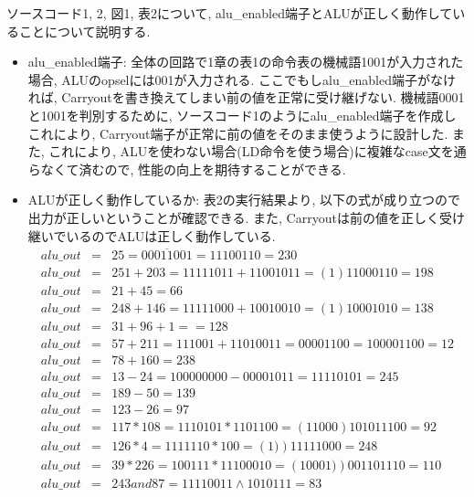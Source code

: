 \documentclass[12pt]{jreport}
\begin{document}
        ソースコード1, 2, 図1, 表2について, alu\_enabled端子とALUが正しく動作していることについて説明する. 
        \begin{itemize}
            \item alu\_enabled端子: 全体の回路で1章の表1の命令表の機械語1001が入力された場合, ALUのopselには001が入力される. ここでもしalu\_enabled端子がなければ, Carryoutを書き換えてしまい前の値を正常に受け継げない. 機械語0001と1001を判別するために, ソースコード1のようにalu\_enabled端子を作成しこれにより, Carryout端子が正常に前の値をそのまま使うように設計した. また, これにより, ALUを使わない場合(LD命令を使う場合)に複雑なcase文を通らなくて済むので, 性能の向上を期待することができる.  \newpage

            \item ALUが正しく動作しているか: 表2の実行結果より, 以下の式が成り立つので出力が正しいということが確認できる. また, Carryoutは前の値を正しく受け継いでいるのでALUは正しく動作している. 
            \begin{eqnarray*}
                alu\_out &=& 25 = \overline{00011001} = 11100110 = 230\\
                alu\_out &=& 251 + 203 = 11111011 + 11001011 = \left(1\right)11000110 = 198\\
                alu\_out &=& 21 + 45 = 66\\    
                alu\_out &=& 248 + 146 = 11111000 + 10010010 = \left(1\right)10001010 = 138\\
                alu\_out &=& 31 + 96 + 1 == 128\\
                alu\_out &=& 57 + 211 = 111001 + 11010011 = 00001100 = 100001100 = 12\\
                alu\_out &=& 78 + 160 = 238\\
                alu\_out &=& 13 - 24 = 100000000 - 00001011 = 11110101 = 245\\
                alu\_out &=& 189 - 50 = 139\\
                alu\_out &=& 123 - 26 = 97\\
                alu\_out &=& 117 * 108 = 1110101 * 1101100 = \left(11000\right)101011100 = 92\\
                alu\_out &=& 126 * 4  = 1111110 * 100 = \left(1)\right)11111000 = 248\\
                alu\_out &=& 39 * 226 = 100111 * 11100010 = \left(10001)\right)001101110 = 110\\
                alu\_out &=& 243 and 87 = 11110011 \wedge 1010111 = 83\\

\end{eqnarray*}
\end{itemize}
\end{document}
